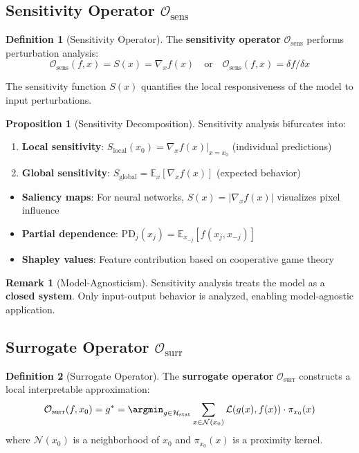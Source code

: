\documentclass[11pt,a4paper]{article}
\theoremstyle{definition}
\newtheorem{definition}{Definition}[section]
\newtheorem{proposition}{Proposition}[section]
\newtheorem{remark}{Remark}[section]
\newcommand{\E}{\mathbb{E}}
\newcommand{\Hstat}{\mathcal{H}_{\text{stat}}}
\newcommand{\Osens}{\mathcal{O}_{\text{sens}}}
\newcommand{\Osurr}{\mathcal{O}_{\text{surr}}}
\newcommand{\Neigh}{\mathcal{N}}
\begin{document}
\subsection{Sensitivity Operator $\Osens$}

\begin{definition}[Sensitivity Operator]
The \textbf{sensitivity operator} $\Osens$ performs perturbation analysis:
\begin{equation}
\Osens(f, x) = S(x) = \nabla_x f(x) \quad \text{or} \quad \Osens(f, x) = \delta f / \delta x
\end{equation}
\end{definition}

The sensitivity function $S(x)$ quantifies the local responsiveness of the model to input perturbations.

\begin{proposition}[Sensitivity Decomposition]
Sensitivity analysis bifurcates into:
\begin{enumerate}    \item \textbf{Local sensitivity}: $S_{\text{local}}(x_0) = \nabla_x f(x)|_{x=x_0}$ (individual predictions)
    \item \textbf{Global sensitivity}: $S_{\text{global}} = \E_x[\nabla_x f(x)]$ (expected behavior)
\end{enumerate}
\end{proposition}

\begin{itemize}    \item \textbf{Saliency maps}: For neural networks, $S(x) = |\nabla_x f(x)|$ visualizes pixel influence
    \item \textbf{Partial dependence}: $\text{PD}_j(x_j) = \E_{x_{-j}}[f(x_j, x_{-j})]$
    \item \textbf{Shapley values}: Feature contribution based on cooperative game theory
\end{itemize}

\begin{remark}[Model-Agnosticism]
Sensitivity analysis treats the model as a \textbf{closed system}. Only input-output behavior is analyzed, enabling model-agnostic application.
\end{remark}

\subsection{Surrogate Operator $\Osurr$}

\begin{definition}[Surrogate Operator]
The \textbf{surrogate operator} $\Osurr$ constructs a local interpretable approximation:
\begin{equation}
\Osurr(f, x_0) = g^* = \argmin_{g \in \Hstat} \sum_{x \in \Neigh(x_0)} \mathcal{L}(g(x), f(x)) \cdot \pi_{x_0}(x)
\end{equation}
where $\Neigh(x_0)$ is a neighborhood of $x_0$ and $\pi_{x_0}(x)$ is a proximity kernel.
\end{definition}
\end{document}
